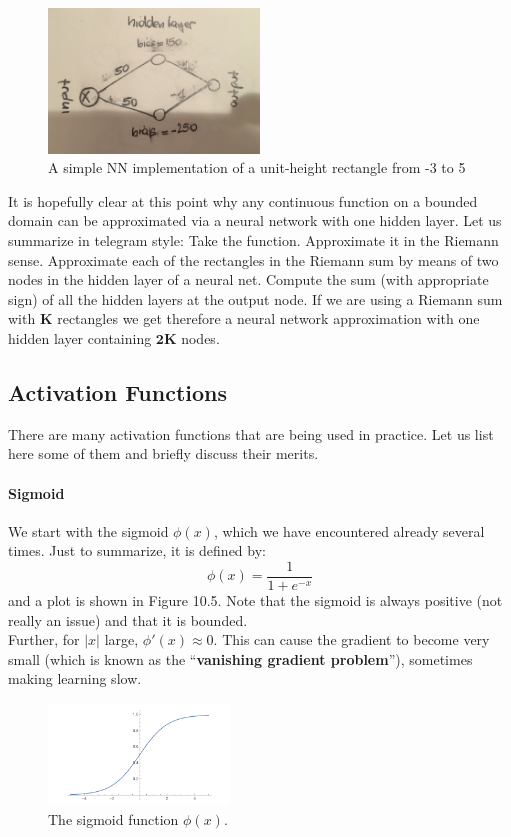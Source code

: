 \documentclass[twoside]{article}
\begin{document}
\begin{figure}[h]
\centering
\includegraphics[width=0.5\textwidth]{img/nn_rect.png}
\caption{A simple NN implementation of a unit-height rectangle from -3 to 5}
\end{figure}


It is hopefully clear at this point why any continuous function
on a bounded domain can be approximated via a neural
network with one hidden layer. Let us summarize in telegram
style: Take the function. Approximate it in the Riemann sense. Approximate each of the rectangles in the Riemann
sum by means of two nodes in the hidden layer of a neural
net. Compute the sum (with appropriate sign) of all the
hidden layers at the output node. If we are using a Riemann
sum with $\mathbf{K}$ rectangles we get therefore a neural network
approximation with one hidden layer containing $\mathbf{2K}$ nodes.
\newpage

\subsection{Activation Functions}
There are many activation functions that are being used in
practice. Let us list here some of them and briefly discuss
their merits.

\paragraph{Sigmoid}
We start with the sigmoid $\phi(x)$, which we have encountered
already several times. Just to summarize, it is defined by:
$$\phi(x) = \dfrac{1}{1+e^{-x}}$$
and a plot is shown in Figure 10.5. Note that the sigmoid is always positive (not really an issue) and that it is bounded. \\ Further, for $|x|$ large, $ \phi'(x)  \approx 0$. This can cause the gradient to become very small (which is known as the “\textbf{vanishing
gradient problem}”), sometimes making learning slow.


\begin{figure}[h]
\centering
\includegraphics[width=0.43\textwidth]{img/sigmoid.png}
\caption{The sigmoid function $\phi(x)$.}
\end{figure}
\end{document}
